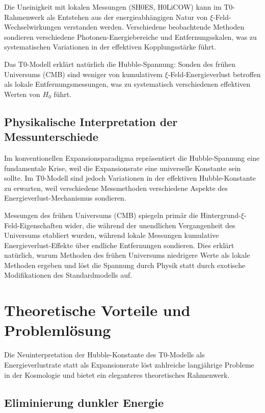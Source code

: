 \documentclass[12pt,a4paper]{article}
\begin{document}
	Die Uneinigkeit mit lokalen Messungen (SH0ES, H0LiCOW) kann im T0-Rahmenwerk als Entstehen aus der energieabhängigen Natur von $\xi$-Feld-Wechselwirkungen verstanden werden. Verschiedene beobachtende Methoden sondieren verschiedene Photonen-Energiebereiche und Entfernungsskalen, was zu systematischen Variationen in der effektiven Kopplungsstärke führt.
	
	\begin{experimental}
		Das T0-Modell erklärt natürlich die Hubble-Spannung: Sonden des frühen Universums (CMB) sind weniger von kumulativem $\xi$-Feld-Energieverlust betroffen als lokale Entfernungsmessungen, was zu systematisch verschiedenen effektiven Werten von $H_0$ führt.
	\end{experimental}
	
	\subsection{Physikalische Interpretation der Messunterschiede}
	
	Im konventionellen Expansionsparadigma repräsentiert die Hubble-Spannung eine fundamentale Krise, weil die Expansionsrate eine universelle Konstante sein sollte. Im T0-Modell sind jedoch Variationen in der effektiven Hubble-Konstante zu erwarten, weil verschiedene Messmethoden verschiedene Aspekte des Energieverlust-Mechanismus sondieren.
	
	Messungen des frühen Universums (CMB) spiegeln primär die Hintergrund-$\xi$-Feld-Eigenschaften wider, die während der unendlichen Vergangenheit des Universums etabliert wurden, während lokale Messungen kumulative Energieverlust-Effekte über endliche Entfernungen sondieren. Dies erklärt natürlich, warum Methoden des frühen Universums niedrigere Werte als lokale Methoden ergeben und löst die Spannung durch Physik statt durch exotische Modifikationen des Standardmodells auf.
	
	\section{Theoretische Vorteile und Problemlösung}
	
	Die Neuinterpretation der Hubble-Konstante des T0-Modells als Energieverlustrate statt als Expansionsrate löst zahlreiche langjährige Probleme in der Kosmologie und bietet ein eleganteres theoretisches Rahmenwerk.
	
	\subsection{Eliminierung dunkler Energie}
	
\end{document}
